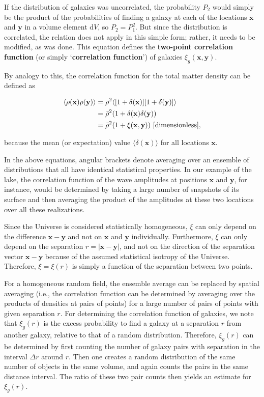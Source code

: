 \documentclass[a4paper,11pt]{article}
\begin{document}
{\noindent}If the distribution of galaxies was uncorrelated, the probability $P_2$ would simply be the product of the probabilities of finding a galaxy at each of the locations $\mathbf{x}$ and $\mathbf{y}$ in a volume element $\mathrm{d}V$, so $P_2=P_1^2$. But since the distribution is correlated, the relation does not apply in this simple form; rather, it needs to be modified, as was done. This equation defines the \textbf{two-point correlation function} (or simply `\textbf{correlation function}') of galaxies $\xi_g(\mathbf{x},\mathbf{y})$.

{\noindent}By analogy to this, the correlation function for the total matter density can be defined as

\begin{align*}
    \langle\rho(\mathbf{x})\rho(\mathbf{y})\rangle &= \bar{\rho}^2\langle[1+\delta(\mathbf{x})][1+\delta(\mathbf{y})]\rangle \\
    &= \bar{\rho}^2 (1+\delta(\mathbf{x})\delta(\mathbf{y})) \\
    &= \bar{\rho}^2(1+\xi(\mathbf{x},\mathbf{y})) ~ [{\rm dimensionless}],
\end{align*}

{\noindent}because the mean (or expectation) value $\langle\delta(\mathbf{x})\rangle$ for all locations $\mathbf{x}$.

{\noindent}In the above equations, angular brackets denote averaging over an ensemble of distributions that all have identical statistical properties. In our example of the lake, the correlation function of the wave amplitudes at positions $\mathbf{x}$ and $\mathbf{y}$, for instance, would be determined by taking a large number of snapshots of its surface and then averaging the product of the amplitudes at these two locations over all these realizations.

{\noindent}Since the Universe is considered statistically homogeneous, $\xi$ can only depend on the difference $\mathbf{x}-\mathbf{y}$ and not on $\mathbf{x}$ and $\mathbf{y}$ individually. Furthermore, $\xi$ can only depend on the separation $r=\lvert\mathbf{x}-\mathbf{y}\rvert$, and not on the direction of the separation vector $\mathbf{x}-\mathbf{y}$ because of the assumed statistical isotropy of the Universe. Therefore, $\xi=\xi(r)$ is simply a function of the separation between two points.

{\noindent}For a homogeneous random field, the ensemble average can be replaced by spatial averaging (i.e., the correlation function can be determined by averaging over the products of densities at pairs of points) for a large number of pairs of points with given separation $r$. For determining the correlation function of galaxies, we note that $\xi_g(r)$ is the excess probability to find a galaxy at a separation $r$ from another galaxy, relative to that of a random distribution. Therefore, $\xi_g(r)$ can be determined by first counting the number of galaxy pairs with separation in the interval $\Delta r$ around $r$. Then one creates a random distribution of the same number of objects in the same volume, and again counts the pairs in the same distance interval. The ratio of these two pair counts then yields an estimate for $\xi_g(r)$.
\end{document}
